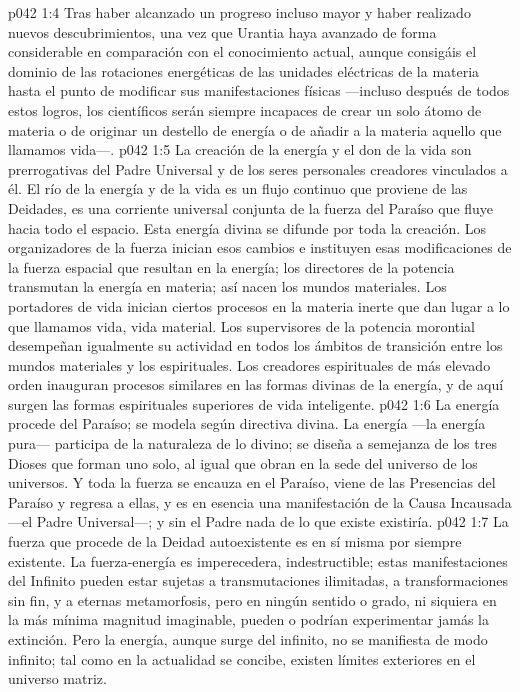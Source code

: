 \vs p042 1:4 Tras haber alcanzado un progreso incluso mayor y haber realizado nuevos descubrimientos, una vez que Urantia haya avanzado de forma considerable en comparación con el conocimiento actual, aunque consigáis el dominio de las rotaciones energéticas de las unidades eléctricas de la materia hasta el punto de modificar sus manifestaciones físicas ---incluso después de todos estos logros, los científicos serán siempre incapaces de crear un solo átomo de materia o de originar un destello de energía o de añadir a la materia aquello que llamamos vida---.
\vs p042 1:5 \pc La creación de la energía y el don de la vida son prerrogativas del Padre Universal y de los seres personales creadores vinculados a él. El río de la energía y de la vida es un flujo continuo que proviene de las Deidades, es una corriente universal conjunta de la fuerza del Paraíso que fluye hacia todo el espacio. Esta energía divina se difunde por toda la creación. Los organizadores de la fuerza inician esos cambios e instituyen esas modificaciones de la fuerza espacial que resultan en la energía; los directores de la potencia transmutan la energía en materia; así nacen los mundos materiales. Los portadores de vida inician ciertos procesos en la materia inerte que dan lugar a lo que llamamos vida, vida material. Los supervisores de la potencia morontial desempeñan igualmente su actividad en todos los ámbitos de transición entre los mundos materiales y los espirituales. Los creadores espirituales de más elevado orden inauguran procesos similares en las formas divinas de la energía, y de aquí surgen las formas espirituales superiores de vida inteligente.
\vs p042 1:6 \pc La energía procede del Paraíso; se modela según directiva divina. La energía ---la energía pura--- participa de la naturaleza de lo divino; se diseña a semejanza de los tres Dioses que forman uno solo, al igual que obran en la sede del universo de los universos. Y toda la fuerza se encauza en el Paraíso, viene de las Presencias del Paraíso y regresa a ellas, y es en esencia una manifestación de la Causa Incausada ---el Padre Universal---; y sin el Padre nada de lo que existe existiría.
\vs p042 1:7 La fuerza que procede de la Deidad autoexistente es en sí misma por siempre existente. La fuerza\hyp{}energía es imperecedera, indestructible; estas manifestaciones del Infinito pueden estar sujetas a transmutaciones ilimitadas, a transformaciones sin fin, y a eternas metamorfosis, pero en ningún sentido o grado, ni siquiera en la más mínima magnitud imaginable, pueden o podrían experimentar jamás la extinción. Pero la energía, aunque surge del infinito, no se manifiesta de modo infinito; tal como en la actualidad se concibe, existen límites exteriores en el universo matriz.
